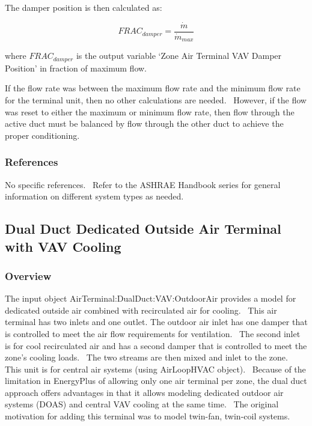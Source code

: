 The damper position is then calculated as:

\begin{equation}
  FRAC_{damper} = \frac{\dot{m}}{\dot{m}_{max}}
\end{equation}

where \(FRA{C_{damper}}\) is the output variable `Zone Air Terminal VAV Damper Position' in fraction of maximum flow.

If the flow rate was between the maximum flow rate and the minimum flow rate for the terminal unit, then no other calculations are needed.~ However, if the flow was reset to either the maximum or minimum flow rate, then flow through the active duct must be balanced by flow through the other duct to achieve the proper conditioning.

\subsubsection{References}\label{references-5}

No specific references.~ Refer to the ASHRAE Handbook series for general information on different system types as needed.

\subsection{Dual Duct Dedicated Outside Air Terminal with VAV Cooling}\label{dual-duct-dedicated-outside-air-terminal-with-vav-cooling}

\subsubsection{Overview}\label{overview-5-000}

The input object AirTerminal:DualDuct:VAV:OutdoorAir provides a model for dedicated outside air combined with recirculated air for cooling.~ This air terminal has two inlets and one outlet. The outdoor air inlet has one damper that is controlled to meet the air flow requirements for ventilation.~ The second inlet is for cool recirculated air and has a second damper that is controlled to meet the zone's cooling loads.~ The two streams are then mixed and inlet to the zone.~ This unit is for central air systems (using AirLoopHVAC object). ~Because of the limitation in EnergyPlus of allowing only one air terminal per zone, the dual duct approach offers advantages in that it allows modeling dedicated outdoor air systems (DOAS) and central VAV cooling at the same time.~ The original motivation for adding this terminal was to model twin-fan, twin-coil systems.

